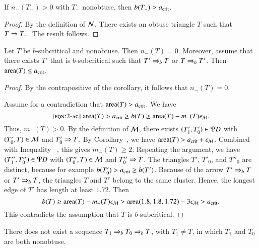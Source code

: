 \begin{corollary} 
  If $n_-(T_-)>0$ with $T_-$ nonobtuse, then $b(T_-) > a_\text{crit}$.
\end{corollary}  

\begin{proof}  
  By the definition of $\mathcal N$, There exists an obtuse triangle $T$ such
  that $T\Rightarrow T_-$.  The result follows.
\end{proof}

\begin{lemma}  
  Let $T$ be $b$-subcritical and nonobtuse.  Then $n_-(T)=0$.
  Moreover, assume that there exists $T'$ that is $b$-subcritical such
  that $T'\Rightarrow_{b} T$ or $T\Rightarrow_{b} T'$.  Then ${\operatorname{area}}(T)\le a_\text{crit}$.
\end{lemma}

\begin{proof}  
  By the contrapositive of the corollary, it follows that $n_-(T)=0$.

Assume for a contradiction that ${\operatorname{area}}(T) > a_\text{crit}$.
We have
\begin{equation}\libel{eqn:2-ac}
\area(T) > \acrit \ge b(T) \ge \area(T) - m_-(T) \epsM.
\end{equation}
Thus, $m_-(T) >0$.  By the definition of $\mathcal M$, there exists
$(T'_1,T'_0)\in\Psi D$ with $(T'_0,T)\in\mathcal M$ and $T'_0\Rightarrow T$.  By
Corollary~, we have ${\operatorname{area}}(T) >
a_\text{crit}+\epsilon_{\mathcal M}$. Combined with Inequality ~, this gives
$m_-(T)\ge 2$.  Repeating the argument, we have $(T''_1,T''_0)\in \Psi D$
with $(T''_0,T)\in \mathcal M$ and $T''_0\Rightarrow T$.  The triangles $T'$, $T'_0$,
and $T''_0$ are distinct, because for example $b(T'_0) > a_\text{crit} \ge
b(T')$.  Because of the arrow $T'\Rightarrow_{b} T$ or $T'\Rightarrow_{b} T$, the triangles
$T$ and $T'$ belong to the same cluster.  Hence, the longest edge of
$T'$ has length at least $1.72$.  Then
\[
b(T) \ge {\operatorname{area}}(T) - m_-(T)\epsilon_{\mathcal M} > {\operatorname{area}}(1.8,1.8,1.72) - 3\epsilon_{\mathcal M} > a_\text{crit}.
\]
This  contradicts the assumption that $T$ is $b$-subcritical.
\end{proof}

\begin{lemma}  There does not exist a
  sequence $T_1\Rightarrow_{b} T_0 \Rightarrow_{b} T$, with $T_1\ne T$, in which $T_1$
  and $T_0$ are both nonobtuse.
\end{lemma}

